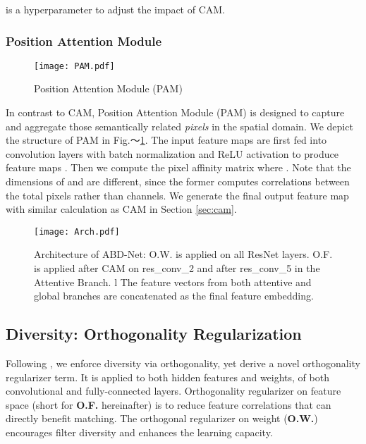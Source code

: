 \documentclass[10pt,twocolumn]{article}
\begin{document}
 is a hyperparameter to adjust the impact of CAM.

\subsubsection{Position Attention Module} \label{sec:pam}


\begin{figure}[t]
\begin{center}
   \texttt{[image: PAM.pdf]}
\end{center}
   \caption{Position Attention Module (PAM)}
\label{fig:pam}
\vspace{-1mm}
\end{figure}

In contrast to CAM, Position Attention Module (PAM) is designed to capture and aggregate those semantically related \textit{pixels} in the spatial domain. We depict the structure of PAM in Fig.～\ref{fig:pam}. The input feature maps  are first fed into convolution layers with batch normalization and ReLU activation to produce feature maps . Then we compute the pixel affinity matrix  where . Note that the dimensions of  and  are different, since the former computes correlations between the total  pixels rather than  channels. We generate the final output feature map  with similar calculation as CAM in Section \ref{sec:cam}.

\begin{figure*}[ht]
\begin{center}
   \texttt{[image: Arch.pdf]}
\end{center}
   \caption{Architecture of ABD-Net: O.W. is applied on all ResNet layers. O.F. is applied after CAM on res\_conv\_2 and after res\_conv\_5 in the Attentive Branch. 
l   The feature vectors from both attentive and global branches are concatenated as the final feature embedding.}
\label{fig:arch}
\vspace{-1mm}
\end{figure*}


\subsection{Diversity: Orthogonality Regularization}

Following \cite{Sun_2017}, we enforce diversity via orthogonality, yet derive a novel orthogonality regularizer term. It is applied to both hidden features and weights, of both convolutional 
and fully-connected layers. Orthogonality regularizer on feature space (short for \textbf{O.F.} hereinafter) is to reduce feature correlations that can directly benefit matching. The orthogonal regularizer on weight (\textbf{O.W.}) encourages filter diversity \cite{bansal2018can} and enhances the learning capacity. 
\end{document}
